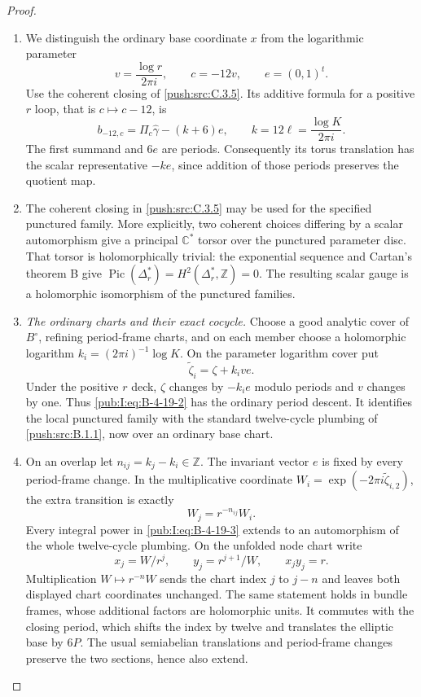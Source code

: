 \begin{proof}
\begin{enumerate}[label=\arabic*.,leftmargin=*]
\item We distinguish the ordinary base coordinate $x$ from
the logarithmic parameter
\[
 v=\frac{\log r}{2\pi i},\qquad c=-12v,
 \qquad e=(0,1)^t.
\]
Use the coherent closing of \ref{push:src:C.3.5}. Its additive formula
for a positive $r$ loop, that is $c\mapsto c-12$, is
\begin{equation}
 b_{-12,c}=\Pi_c\widehat\gamma-(k+6)e,
 \qquad k=12\ell=\frac{\log K}{2\pi i}.
\label{pub:I:eq:B-4-19-1}
\end{equation}
The first summand and $6e$ are periods.
Consequently its torus translation has the scalar
representative $-ke$, since addition of those periods
preserves the quotient map.

\item The coherent closing in \ref{push:src:C.3.5} may be used for the
specified punctured family. More explicitly, two
coherent choices differing by a scalar automorphism
give a principal $\mathbb C^*$ torsor over the punctured
parameter disc. That torsor is holomorphically trivial:
the exponential sequence and Cartan's theorem B give
$\operatorname{Pic}(\Delta_r^*)=H^2(\Delta_r^*,\mathbb Z)=0$.
The resulting scalar gauge is a holomorphic
isomorphism of the punctured families.

\item \emph{The ordinary charts and their exact cocycle.}
Choose a good analytic cover of $B^\circ$, refining
period-frame charts, and on each member choose a
holomorphic logarithm $k_i=(2\pi i)^{-1}\log K$.
On the parameter logarithm cover put
\begin{equation}
 \widetilde\zeta_i=\zeta+k_i v e.
\label{pub:I:eq:B-4-19-2}
\end{equation}
Under the positive $r$ deck, $\zeta$ changes by
$-k_i e$ modulo periods and $v$ changes by one.
Thus \eqref{pub:I:eq:B-4-19-2} has the ordinary period descent.
It identifies the local punctured family
with the standard twelve-cycle plumbing of \ref{push:src:B.1.1},
now over an ordinary base chart.

\item On an overlap let $n_{ij}=k_j-k_i\in\mathbb Z$.
The invariant vector $e$ is fixed by every period-frame
change. In the multiplicative coordinate
$W_i=\exp(-2\pi i\widetilde\zeta_{i,2})$, the extra
transition is exactly
\begin{equation}
 W_j=r^{-n_{ij}}W_i.
\label{pub:I:eq:B-4-19-3}
\end{equation}
Every integral power in \eqref{pub:I:eq:B-4-19-3} extends to an
automorphism of the whole twelve-cycle plumbing.
On the unfolded node chart write
\[
 x_j=W/r^j,\qquad y_j=r^{j+1}/W,
 \qquad x_jy_j=r.
\]
Multiplication $W\mapsto r^{-n}W$ sends the chart
index $j$ to $j-n$ and leaves both displayed chart
coordinates unchanged. The same statement holds
in bundle frames, whose additional factors are
holomorphic units. It commutes with the closing
period, which shifts the index by twelve and
translates the elliptic base by $6P$.
The usual semiabelian translations and period-frame
changes preserve the two sections, hence also extend.


\end{enumerate}
\end{proof}
